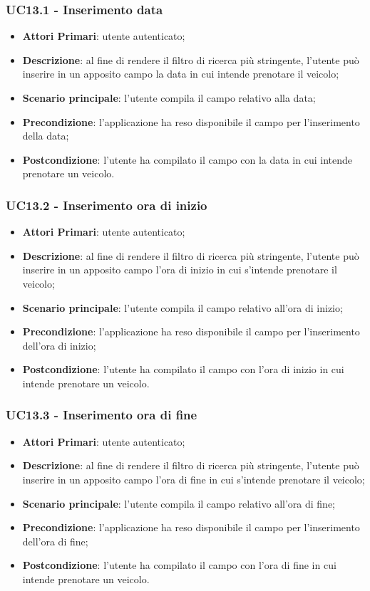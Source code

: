 \subsubsection{UC13.1 - Inserimento data}
\begin{itemize}
	\item \textbf{Attori Primari}: utente autenticato;
	\item \textbf{Descrizione}: al fine di rendere il filtro di ricerca più stringente, l'utente può inserire in un apposito campo la data in cui intende prenotare il veicolo;
	\item \textbf{Scenario principale}: l'utente compila il campo relativo alla data;	
	\item \textbf{Precondizione}: l'applicazione ha reso disponibile il campo per l'inserimento della data;
	\item \textbf{Postcondizione}: l'utente ha compilato il campo con la data in cui intende prenotare un veicolo.	
\end{itemize}
\subsubsection{UC13.2 - Inserimento ora di inizio}
\begin{itemize}
	\item \textbf{Attori Primari}: utente autenticato;
	\item \textbf{Descrizione}: al fine di rendere il filtro di ricerca più stringente, l'utente può inserire in un apposito campo l'ora di inizio in cui s'intende prenotare il veicolo;
	\item \textbf{Scenario principale}: l'utente compila il campo relativo all'ora di inizio;	
	\item \textbf{Precondizione}: l'applicazione ha reso disponibile il campo per l'inserimento dell'ora di inizio;
	\item \textbf{Postcondizione}: l'utente ha compilato il campo con l'ora di inizio in cui intende prenotare un veicolo.	
\end{itemize}
\subsubsection{UC13.3 - Inserimento ora di fine}
\begin{itemize}
	\item \textbf{Attori Primari}: utente autenticato;
	\item \textbf{Descrizione}: al fine di rendere il filtro di ricerca più stringente, l'utente può inserire in un apposito campo l'ora di fine in cui s'intende prenotare il veicolo;
	\item \textbf{Scenario principale}: l'utente compila il campo relativo all'ora di fine;	
	\item \textbf{Precondizione}: l'applicazione ha reso disponibile il campo per l'inserimento dell'ora di fine;
	\item \textbf{Postcondizione}: l'utente ha compilato il campo con l'ora di fine in cui intende prenotare un veicolo.	
\end{itemize}
